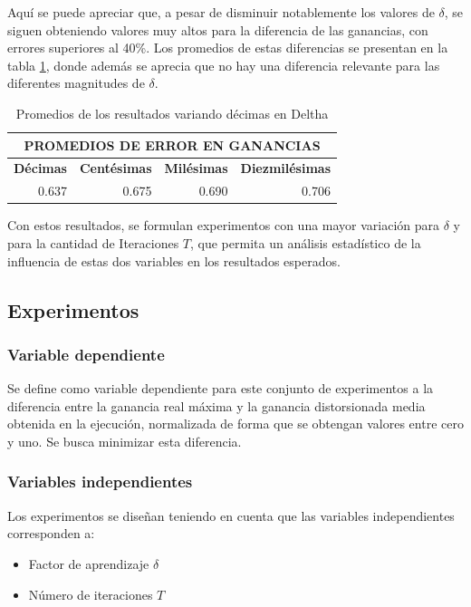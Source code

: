 Aquí se puede apreciar que, a pesar de disminuir notablemente los valores de $\delta$, se siguen obteniendo valores muy altos para la diferencia de las ganancias, con errores superiores al 40\%. Los promedios de estas diferencias se presentan en la tabla \ref{delthas_0000}, donde además se aprecia que no hay una diferencia relevante para las diferentes magnitudes de $\delta$.

\begin{table}[h]
\centering
\caption{Promedios de los resultados variando décimas en Deltha}
\begin{tabular}{llll} \\ \hline  
\multicolumn{4}{c}{\textbf{PROMEDIOS DE ERROR EN GANANCIAS}}                                                  \\ \hline  
\textbf{Décimas}          & \textbf{Centésimas}       & \textbf{Milésimas}        & \textbf{Diezmilésimas}    \\ \hline  
\multicolumn{1}{r}{0.637} & \multicolumn{1}{r}{0.675} & \multicolumn{1}{r}{0.690} & \multicolumn{1}{r}{0.706} \\ \hline  
\end{tabular}
\label{delthas_0000}
\end{table}

Con estos resultados, se formulan experimentos con una mayor variación para $\delta$ y para la cantidad de Iteraciones $T$, que permita un análisis estadístico de la influencia de estas dos variables en los resultados esperados.

\subsection{Experimentos}

\subsubsection{Variable dependiente}

Se define como variable dependiente para este conjunto de experimentos a la diferencia entre la ganancia real máxima y la ganancia distorsionada media obtenida en la ejecución, normalizada de forma que se obtengan valores entre cero y uno. Se busca minimizar esta diferencia.

\subsubsection{Variables independientes}
Los experimentos se diseñan teniendo en cuenta que las variables independientes corresponden a: 
\begin{itemize}
    \item Factor de aprendizaje $\delta$
    \item Número de iteraciones $T$
\end{itemize}

